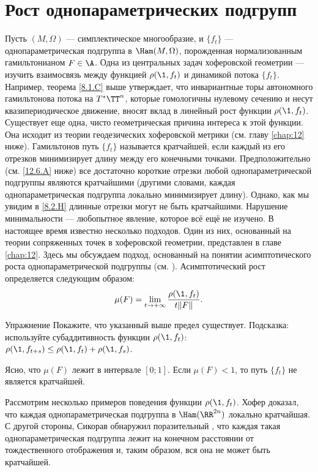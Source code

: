 \section{Рост однопараметрических подгрупп}
Пусть $(M, \Omega)$ --- симплектическое многообразие, и $\{f_t\}$ --- однопараметрическая подгруппа в $\Ham (M, \Omega)$, порожденная нормализованным гамильтонианом $F \in \A$.
Одна из центральных задач хоферовской геометрии --- изучить взаимосвязь между функцией $\rho (\1, f_t)$ и динамикой потока $\{f_t\}$.
Например, теорема \ref{8.1.C} выше утверждает, что инвариантные торы автономного гамильтонова потока на $T^\ast \TT^n$, которые гомологичны нулевому сечению и несут квазипериодическое движение, вносят вклад в линейный рост функции $\rho (\1, f_t)$.
Существует еще одна, чисто геометрическая причина интереса к этой функции.
Она исходит из теории геодезических хоферовской метрики (см. главу \ref{chap:12} ниже).
Гамильтонов путь $\{f_t\}$ называется кратчайшей, если каждый из его отрезков минимизирует длину между его конечными точками.
Предположительно (см. \ref{12.6.A} ниже) все достаточно короткие отрезки любой однопараметрической подгруппы являются кратчайшими (другими словами, каждая однопараметрическая подгруппа локально минимизирует длину).
Однако, как мы увидим в \ref{8.2.H} длинные отрезки могут не быть кратчайшими.
Нарушение минимальности --- любопытное явление, которое всё ещё не изучено.
В настоящее время известно несколько подходов.
Один из них, основанный на теории сопряженных точек в хоферовской геометрии, представлен в главе \ref{chap:12}.
Здесь мы обсуждаем подход, основанный на понятии асимптотического роста однопараметрической подгруппы (см. \cite{BP2}).
Асимптотический рост определяется следующим образом:
\[\mu(F)=\lim_{t \to + \infty}\frac{\rho (\1, f_t)}{ t \| F \|}.\]

\begin{thm*}{Упражнение}
Покажите, что указанный выше предел существует.
Подсказка: используйте субаддитивность функции $\rho (\1, f_t)$: $\rho (\1, f_{t + s}) \le \rho (\1, f_t) + \rho (\1, f_s)$.
\end{thm*}

Ясно, что $\mu (F)$ лежит в интервале $[0; 1]$.
Если $\mu (F) <1$, то путь $\{f_t\}$ не является кратчайшей.

Рассмотрим несколько примеров поведения функции $\rho (\1, f_t)$.
Хофер \cite{H2} доказал, что каждая однопараметрическая подгруппа в $\Ham (\RR^{2n})$ локально кратчайшая.
С другой стороны, Сикорав \cite{S2} обнаружил поразительный , что каждая такая однопараметрическая подгруппа лежит на конечном расстоянии от тождественного отображения и, таким образом, вся она не может быть кратчайшей.

